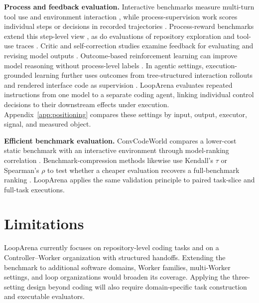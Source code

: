 \textbf{Process and feedback evaluation.} Interactive benchmarks measure multi-turn tool use and environment interaction \citep{AgentBench2023,TauBench2024,TauTwoBench2025,WebArena2023,Song2026MobilityBench}, while process-supervision work scores individual steps or decisions in recorded trajectories \citep{Lightman2023,Uesato2022,MathShepherd2023,ProcessOutcomeCode2024}. Process-reward benchmarks extend this step-level view \citep{ProcessBench2024,PRMBench2025}, as do evaluations of repository exploration and tool-use traces \citep{AgentProcessBench2026,SWEExplore2026,AgentAtlas2026,TRAIL2025}. Critic and self-correction studies examine feedback for evaluating and revising model outputs \citep{Reflexion2023,SelfRefine2023,LLMCritics2024,Huang2024SelfCorrect,Olausson2023SelfRepair}. Outcome-based reinforcement learning can improve model reasoning without process-level labels \citep{Chu2026GPG}. In agentic settings, execution-grounded learning further uses outcomes from tree-structured interaction rollouts and rendered interface code as supervision \citep{Ji2025TreeGRPO,Zheng2026Code2World}. LoopArena evaluates repeated instructions from one model to a separate coding agent, linking individual control decisions to their downstream effects under execution. Appendix~\ref{app:positioning} compares these settings by input, output, executor, signal, and measured object.

\textbf{Efficient benchmark evaluation.} ConvCodeWorld compares a lower-cost static benchmark with an interactive environment through model-ranking correlation \citep{Han2025ConvCodeWorld}. Benchmark-compression methods likewise use Kendall's \(\tau\) or Spearman's \(\rho\) to test whether a cheaper evaluation recovers a full-benchmark ranking \citep{Yuan2025TailoredBench,Zhang2026RepCore}. LoopArena applies the same validation principle to paired task-slice and full-task executions.

\section{Limitations}
\label{sec:limitations}

LoopArena currently focuses on repository-level coding tasks and on a Controller--Worker organization with structured handoffs. Extending the benchmark to additional software domains, Worker families, multi-Worker settings, and loop organizations would broaden its coverage. Applying the three-setting design beyond coding will also require domain-specific task construction and executable evaluators.

